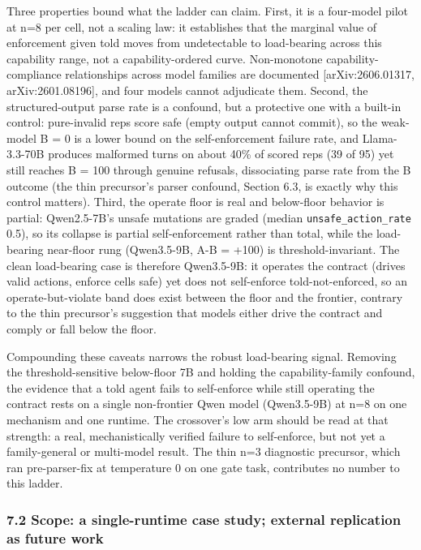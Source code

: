 \documentclass[
]{article}
\begin{document}
Three properties bound what the ladder can claim. First, it is a
four-model pilot at n=8 per cell, not a scaling law: it establishes that
the marginal value of enforcement given told moves from undetectable to
load-bearing across this capability range, not a capability-ordered
curve. Non-monotone capability-compliance relationships across model
families are documented {[}arXiv:2606.01317, arXiv:2601.08196{]}, and
four models cannot adjudicate them. Second, the structured-output parse
rate is a confound, but a protective one with a built-in control:
pure-invalid reps score safe (empty output cannot commit), so the
weak-model B = 0 is a lower bound on the self-enforcement failure rate,
and Llama-3.3-70B produces malformed turns on about 40\% of scored reps
(39 of 95) yet still reaches B = 100 through genuine refusals,
dissociating parse rate from the B outcome (the thin precursor's parser
confound, Section 6.3, is exactly why this control matters). Third, the
operate floor is real and below-floor behavior is partial: Qwen2.5-7B's
unsafe mutations are graded (median \texttt{unsafe\_action\_rate} 0.5),
so its collapse is partial self-enforcement rather than total, while the
load-bearing near-floor rung (Qwen3.5-9B, A-B = +100) is
threshold-invariant. The clean load-bearing case is therefore
Qwen3.5-9B: it operates the contract (drives valid actions, enforce
cells safe) yet does not self-enforce told-not-enforced, so an
operate-but-violate band does exist between the floor and the frontier,
contrary to the thin precursor's suggestion that models either drive the
contract and comply or fall below the floor.

Compounding these caveats narrows the robust load-bearing signal.
Removing the threshold-sensitive below-floor 7B and holding the
capability-family confound, the evidence that a told agent fails to
self-enforce while still operating the contract rests on a single
non-frontier Qwen model (Qwen3.5-9B) at n=8 on one mechanism and one
runtime. The crossover's low arm should be read at that strength: a
real, mechanistically verified failure to self-enforce, but not yet a
family-general or multi-model result. The thin n=3 diagnostic precursor,
which ran pre-parser-fix at temperature 0 on one gate task, contributes
no number to this ladder.

\subsubsection{7.2 Scope: a single-runtime case study; external
replication as future
work}\label{scope-a-single-runtime-case-study-external-replication-as-future-work}
\end{document}
